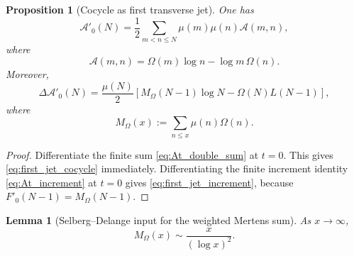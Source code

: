 \documentclass[11pt]{amsart}
\numberwithin{equation}{section}
\theoremstyle{plain}
\newtheorem{proposition}[theorem]{Proposition}
\newtheorem{lemma}[theorem]{Lemma}
\theoremstyle{definition}
\theoremstyle{remark}
\begin{document}
\begin{proposition}[Cocycle as first transverse jet]
\label{prop:first_jet_cocycle}
One has
\begin{equation}
\boxed{
\mathcal A'_0(N)
=
\frac12\sum_{m<n\le N}\mu(m)\mu(n)\mathscr A(m,n),}
\label{eq:first_jet_cocycle}
\end{equation}
where
\begin{equation}
\mathscr A(m,n)=\Omega(m)\log n-\log m\,\Omega(n).
\label{eq:first_jet_A_definition}
\end{equation}
Moreover,
\begin{equation}
\boxed{
\Delta\mathcal A'_0(N)
=
\frac{\mu(N)}2
\left[
M_\Omega(N-1)\log N-\Omega(N)L(N-1)
\right],}
\label{eq:first_jet_increment}
\end{equation}
where
\begin{equation}
M_\Omega(x):=\sum_{n\le x}\mu(n)\Omega(n).
\label{eq:MOmega_definition}
\end{equation}
\end{proposition}

\begin{proof}
Differentiate the finite sum \eqref{eq:At_double_sum} at \(t=0\).  This gives
\eqref{eq:first_jet_cocycle} immediately.  Differentiating the finite
increment identity \eqref{eq:At_increment} at \(t=0\) gives
\eqref{eq:first_jet_increment}, because
\(F'_0(N-1)=M_\Omega(N-1)\).
\end{proof}

\begin{lemma}[Selberg--Delange input for the weighted Mertens sum]
\label{lem:MOmega_selberg_delange}
As \(x\to\infty\),
\begin{equation}
\boxed{M_\Omega(x)\sim\frac{x}{(\log x)^2}.}
\label{eq:MOmega_asymptotic}
\end{equation}
\end{lemma}
\end{document}
